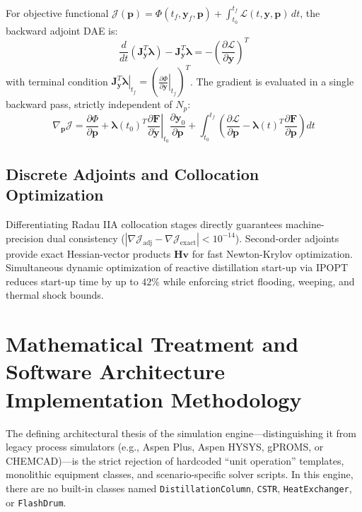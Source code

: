 \documentclass[11pt,a4paper]{article}
\begin{document}
For objective functional $\mathcal{J}(\mathbf{p}) = \Phi(t_f, \mathbf{y}_f, \mathbf{p}) + \int_{t_0}^{t_f} \mathcal{L}(t, \mathbf{y}, \mathbf{p}) \, dt$, the backward adjoint DAE is:
\begin{equation}
\frac{d}{dt}\left( \mathbf{J}_{\dot{\mathbf{y}}}^T \boldsymbol{\lambda} \right) - \mathbf{J}_{\mathbf{y}}^T \boldsymbol{\lambda} = -\left( \frac{\partial \mathcal{L}}{\partial \mathbf{y}} \right)^T
\end{equation}
with terminal condition $\left. \mathbf{J}_{\dot{\mathbf{y}}}^T \boldsymbol{\lambda} \right|_{t_f} = \left( \left. \frac{\partial \Phi}{\partial \mathbf{y}} \right|_{t_f} \right)^T$.
The gradient is evaluated in a single backward pass, strictly independent of $N_p$:
\begin{equation}
\nabla_{\mathbf{p}} \mathcal{J} = \frac{\partial \Phi}{\partial \mathbf{p}} + \left. \boldsymbol{\lambda}(t_0)^T \frac{\partial \mathbf{F}}{\partial \dot{\mathbf{y}}} \right|_{t_0} \frac{\partial \mathbf{y}_0}{\partial \mathbf{p}} + \int_{t_0}^{t_f} \left( \frac{\partial \mathcal{L}}{\partial \mathbf{p}} - \boldsymbol{\lambda}(t)^T \frac{\partial \mathbf{F}}{\partial \mathbf{p}} \right) dt
\end{equation}

\subsection{Discrete Adjoints and Collocation Optimization}
\label{subsec:discrete-adjoints}

Differentiating Radau IIA collocation stages directly guarantees machine-precision dual consistency ($|\nabla \mathcal{J}_{\text{adj}} - \nabla \mathcal{J}_{\text{exact}}| < 10^{-14}$). Second-order adjoints provide exact Hessian-vector products $\mathbf{H}\mathbf{v}$ for fast Newton-Krylov optimization. Simultaneous dynamic optimization of reactive distillation start-up via IPOPT reduces start-up time by up to $42\%$ while enforcing strict flooding, weeping, and thermal shock bounds.

\section{Mathematical Treatment and Software Architecture Implementation Methodology}
\label{sec:software-architecture-methodology}

The defining architectural thesis of the simulation engine---distinguishing it from legacy process simulators (e.g., Aspen Plus, Aspen HYSYS, gPROMS, or CHEMCAD)---is the strict rejection of hardcoded ``unit operation'' templates, monolithic equipment classes, and scenario-specific solver scripts. In this engine, there are no built-in classes named \texttt{DistillationColumn}, \texttt{CSTR}, \texttt{HeatExchanger}, or \texttt{FlashDrum}.
\end{document}
